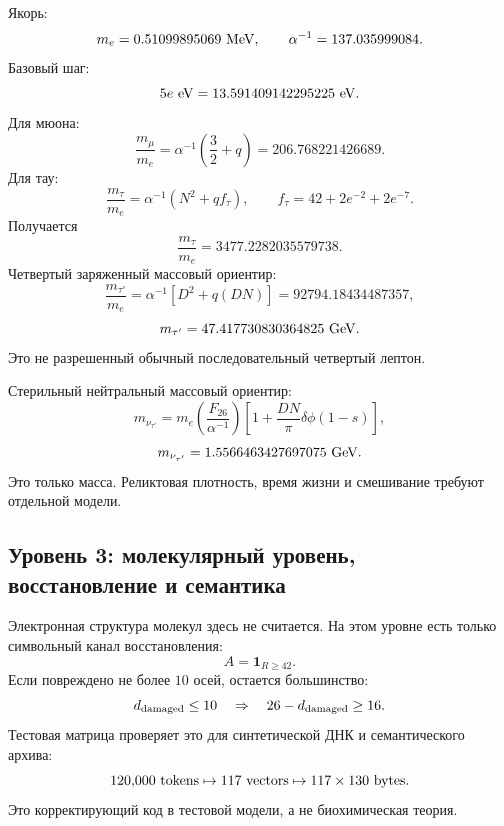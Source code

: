 \documentclass[11pt]{article}
\begin{document}
Якорь:
\begin{equation}
    m_e=0.51099895069~{\rm MeV},
    \qquad
    \alpha^{-1}=137.035999084.
\end{equation}
Базовый шаг:
\begin{equation}
    5e~{\rm eV}=13.591409142295225~{\rm eV}.
\end{equation}
Для мюона:
\begin{equation}
    \frac{m_\mu}{m_e}
    =
    \alpha^{-1}\left(\frac{3}{2}+q\right)
    =
    206.768221426689.
\end{equation}
Для тау:
\begin{equation}
    \frac{m_\tau}{m_e}
    =
    \alpha^{-1}\left(N^2+qf_\tau\right),
    \qquad
    f_\tau=42+2e^{-2}+2e^{-7}.
\end{equation}
Получается
\begin{equation}
    \frac{m_\tau}{m_e}=3477.2282035579738.
\end{equation}
Четвертый заряженный массовый ориентир:
\begin{equation}
    \frac{m_{\tau'}}{m_e}
    =
    \alpha^{-1}\left[D^2+q(DN)\right]
    =
    92794.18434487357,
\end{equation}
\begin{equation}
    m_{\tau'}=47.417730830364825~{\rm GeV}.
\end{equation}
Это не разрешенный обычный последовательный четвертый лептон.

Стерильный нейтральный массовый ориентир:
\begin{equation}
    m_{\nu_{\tau'}}
    =
    m_e
    \left(\frac{F_{26}}{\alpha^{-1}}\right)
    \left[
        1+\frac{DN}{\pi}\delta\phi(1-s)
    \right],
\end{equation}
\begin{equation}
    m_{\nu_{\tau'}}=1.5566463427697075~{\rm GeV}.
\end{equation}
Это только масса.  Реликтовая плотность, время жизни и смешивание требуют
отдельной модели.

\subsection{Уровень 3: молекулярный уровень, восстановление и семантика}

Электронная структура молекул здесь не считается.  На этом уровне есть только
символьный канал восстановления:
\begin{equation}
    A=\mathbf{1}_{R\ge42}.
\end{equation}
Если повреждено не более $10$ осей, остается большинство:
\begin{equation}
    d_{\rm damaged}\le10
    \quad\Rightarrow\quad
    26-d_{\rm damaged}\ge16.
\end{equation}
Тестовая матрица проверяет это для синтетической ДНК и семантического архива:
\begin{equation}
    120{,}000~{\rm tokens}
    \mapsto
    117~{\rm vectors}
    \mapsto
    117\times130~{\rm bytes}.
\end{equation}
Это корректирующий код в тестовой модели, а не биохимическая теория.
\end{document}

